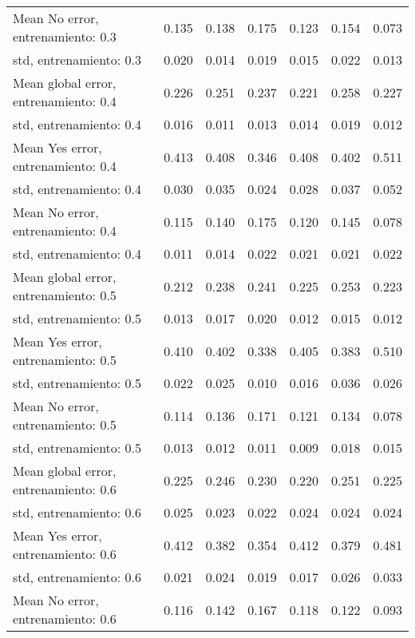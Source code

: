 \begin{longtable}{p{4cm}|p{1.5cm}|p{1.5cm}|p{1.5cm}|p{1.5cm}|p{1.5cm}|p{1.5cm}}
Mean No error, entrenamiento: 0.3     & 0.135 & 0.138 &        0.175 &     0.123 &     0.154 & 0.073 \\
std, entrenamiento: 0.3               & 0.020 & 0.014 &        0.019 &     0.015 &     0.022 & 0.013 \\
Mean global error, entrenamiento: 0.4 & 0.226 & 0.251 &        0.237 &     0.221 &     0.258 & 0.227 \\
std, entrenamiento: 0.4               & 0.016 & 0.011 &        0.013 &     0.014 &     0.019 & 0.012 \\
Mean Yes error, entrenamiento: 0.4    & 0.413 & 0.408 &        0.346 &     0.408 &     0.402 & 0.511 \\
std, entrenamiento: 0.4               & 0.030 & 0.035 &        0.024 &     0.028 &     0.037 & 0.052 \\
Mean No error, entrenamiento: 0.4     & 0.115 & 0.140 &        0.175 &     0.120 &     0.145 & 0.078 \\
std, entrenamiento: 0.4               & 0.011 & 0.014 &        0.022 &     0.021 &     0.021 & 0.022 \\
Mean global error, entrenamiento: 0.5 & 0.212 & 0.238 &        0.241 &     0.225 &     0.253 & 0.223 \\
std, entrenamiento: 0.5               & 0.013 & 0.017 &        0.020 &     0.012 &     0.015 & 0.012 \\
Mean Yes error, entrenamiento: 0.5    & 0.410 & 0.402 &        0.338 &     0.405 &     0.383 & 0.510 \\
std, entrenamiento: 0.5               & 0.022 & 0.025 &        0.010 &     0.016 &     0.036 & 0.026 \\
Mean No error, entrenamiento: 0.5     & 0.114 & 0.136 &        0.171 &     0.121 &     0.134 & 0.078 \\
std, entrenamiento: 0.5               & 0.013 & 0.012 &        0.011 &     0.009 &     0.018 & 0.015 \\
Mean global error, entrenamiento: 0.6 & 0.225 & 0.246 &        0.230 &     0.220 &     0.251 & 0.225 \\
std, entrenamiento: 0.6               & 0.025 & 0.023 &        0.022 &     0.024 &     0.024 & 0.024 \\
Mean Yes error, entrenamiento: 0.6    & 0.412 & 0.382 &        0.354 &     0.412 &     0.379 & 0.481 \\
std, entrenamiento: 0.6               & 0.021 & 0.024 &        0.019 &     0.017 &     0.026 & 0.033 \\
Mean No error, entrenamiento: 0.6     & 0.116 & 0.142 &        0.167 &     0.118 &     0.122 & 0.093 \\

\end{longtable}
